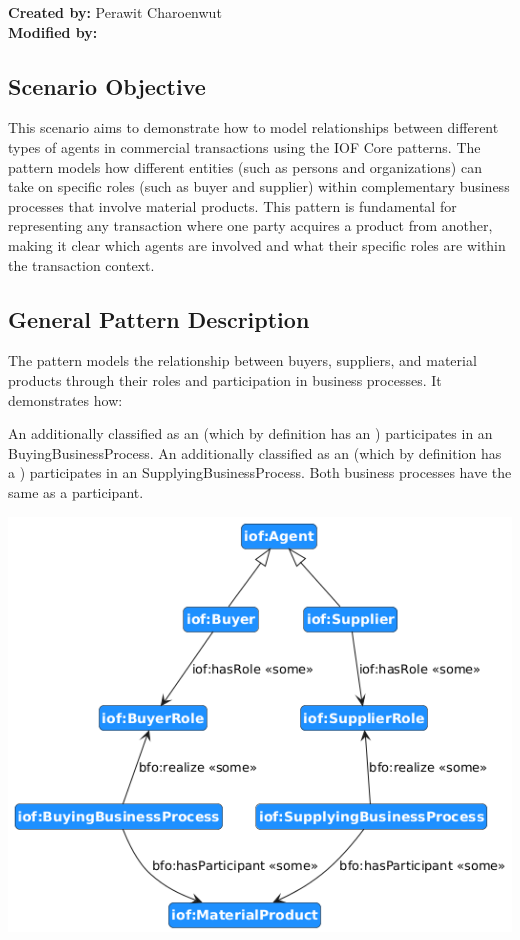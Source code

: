 \label{chapter-scenario-template}
\textbf{Created by:} Perawit Charoenwut \\
\textbf{Modified by:}

\subsection*{Scenario Objective}
This scenario aims to demonstrate how to model relationships between different types of agents in commercial transactions using the IOF Core patterns. The pattern models how different entities (such as persons and organizations) can take on specific roles (such as buyer and supplier) within complementary business processes that involve material products. This pattern is fundamental for representing any transaction where one party acquires a product from another, making it clear which agents are involved and what their specific roles are within the transaction context.

\subsection*{General Pattern Description}
The pattern models the relationship between buyers, suppliers, and material products through their roles and participation in business processes. It demonstrates how:

An  additionally classified as an  (which by definition has an ) participates in an  {BuyingBusinessProcess}.
An  additionally classified as an  (which by definition has a ) participates in an  {SupplyingBusinessProcess}.
Both business processes have the same  as a participant.

\includegraphics[scale=0.4]{scenarios/different-type-agent/image/different-type-agent-schema.png}

